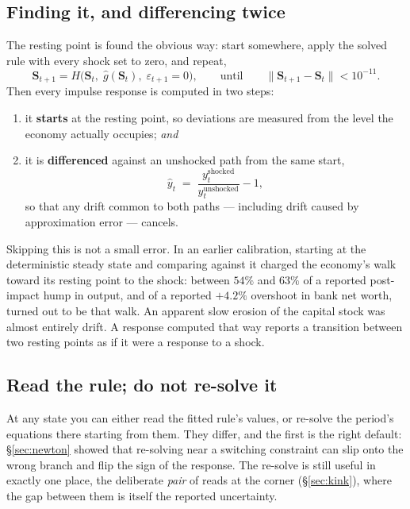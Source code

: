 \documentclass[10pt,a4paper]{article}
\theoremstyle{plain}
\theoremstyle{remark}
\newcommand{\st}{\mathbf{S}}
\begin{document}
\subsection{Finding it, and differencing twice}

The resting point is found the obvious way: start somewhere, apply the solved rule with every shock
set to zero, and repeat,
\begin{equation}
  \st_{t+1} = H\big(\st_t,\;\hat g(\st_t),\;\varepsilon_{t+1}=0\big),
  \qquad\text{until}\qquad \|\st_{t+1}-\st_t\| < 10^{-11}.
\end{equation}
Then every impulse response is computed in two steps:
\begin{enumerate}
\item it \textbf{starts} at the resting point, so deviations are measured from the level the economy
actually occupies; \emph{and}
\item it is \textbf{differenced} against an unshocked path from the same start,
\begin{equation}
  \hat y_t \;=\; \frac{y_t^{\text{shocked}}}{y_t^{\text{unshocked}}} - 1,
  \label{eq:diff}
\end{equation}
so that any drift common to both paths --- including drift caused by approximation error --- cancels.
\end{enumerate}

\noindent Skipping this is not a small error. In an earlier calibration, starting at the
deterministic steady state and comparing against it charged the economy's walk toward its resting
point to the shock: between $54\%$ and $63\%$ of a reported post-impact hump in output, and of a
reported $+4.2\%$ overshoot in bank net worth, turned out to be that walk. An apparent slow erosion of
the capital stock was almost entirely drift. A response computed that way reports a transition
between two resting points as if it were a response to a shock.

\subsection{Read the rule; do not re-solve it}

At any state you can either read the fitted rule's values, or re-solve the period's equations there
starting from them. They differ, and the first is the right default: \S\ref{sec:newton} showed that
re-solving near a switching constraint can slip onto the wrong branch and flip the sign of the
response. The re-solve is still useful in exactly one place, the deliberate \emph{pair} of reads at
the corner (\S\ref{sec:kink}), where the gap between them is itself the reported uncertainty.
\end{document}
